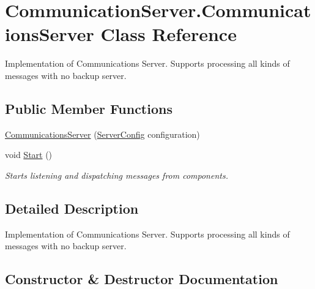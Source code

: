 \hypertarget{class_communication_server_1_1_communications_server}{}\section{Communication\+Server.\+Communications\+Server Class Reference}
\label{class_communication_server_1_1_communications_server}


Implementation of Communications Server. Supports processing all kinds of messages with no backup server.  


\subsection*{Public Member Functions}
\begin{DoxyCompactItemize}
\item 
\hyperlink{class_communication_server_1_1_communications_server_a11e0e840ce3ab49a9efd6ae7170ac202}{Communications\+Server} (\hyperlink{class_communication_server_1_1_server_config}{Server\+Config} configuration)
\item 
void \hyperlink{class_communication_server_1_1_communications_server_a1a50e73dce74bcaf2175cc4073512f05}{Start} ()
\begin{DoxyCompactList}\small\item\em Starts listening and dispatching messages from components. \end{DoxyCompactList}\end{DoxyCompactItemize}


\subsection{Detailed Description}
Implementation of Communications Server. Supports processing all kinds of messages with no backup server. 



\subsection{Constructor \& Destructor Documentation}
\hypertarget{class_communication_server_1_1_communications_server_a11e0e840ce3ab49a9efd6ae7170ac202}{}

